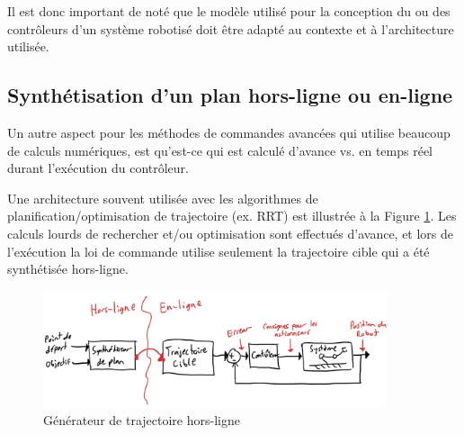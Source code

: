 Il est donc important de noté que le modèle utilisé pour la conception du ou des contrôleurs d'un système robotisé doit être adapté au contexte et à l'architecture utilisée. 


\subsection{Synthétisation d'un plan hors-ligne ou en-ligne}

Un autre aspect pour les méthodes de commandes avancées qui utilise beaucoup de calculs numériques, est qu'est-ce qui est calculé d'avance vs. en temps réel durant l'exécution du contrôleur. 

Une architecture souvent utilisée avec les algorithmes de planification/optimisation de trajectoire (ex. RRT) est illustrée à la Figure \ref{fig:offlinetrajectorygeneration}. Les calculs lourds de rechercher et/ou optimisation sont effectués d'avance, et lors de l'exécution la loi de commande utilise seulement la trajectoire cible qui a été synthétisée hors-ligne.
\begin{figure}[htbp]
	\centering
		\includegraphics[width=0.9\textwidth]{fig/offlinetrajectorygeneration.jpg}
	\caption{Générateur de trajectoire hors-ligne}
	\label{fig:offlinetrajectorygeneration}
\end{figure}

